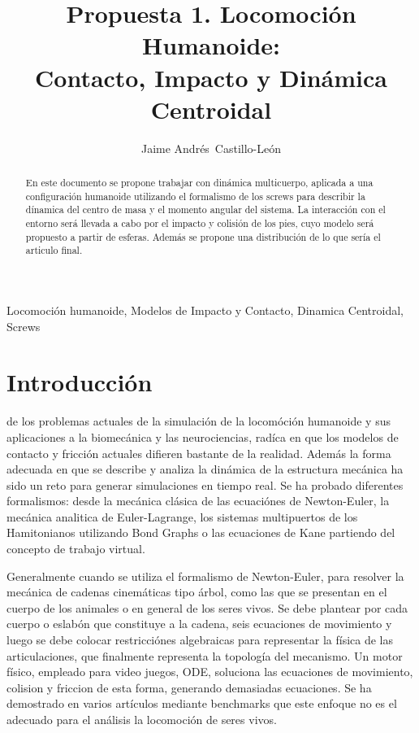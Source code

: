 \documentclass[journal,letterpaper,twoside,twocolumn]{IEEEtran}
\title{Propuesta 1. Locomoción Humanoide:\\Contacto, Impacto y Dinámica Centroidal}
\author{Jaime Andrés~Castillo-León}
\begin{document}
\maketitle
\begin{abstract}
  En este documento se propone trabajar con dinámica multicuerpo, aplicada a una configuración humanoide utilizando el formalismo de los screws para describir la dínamica del centro de masa y el momento angular del sistema. La interacción con el entorno será llevada a cabo por el impacto y colisión de los pies, cuyo modelo será propuesto a partir de esferas. Además se propone una distribución de lo que sería el articulo final.
\end{abstract}
\begin{IEEEkeywords}
  Locomoción humanoide, Modelos de Impacto y Contacto, Dinamica Centroidal, Screws
\end{IEEEkeywords}

\section{Introducción}
\label{sec:intro}
 de los problemas actuales de la simulación de la locomóción humanoide y sus aplicaciones a la biomecánica y las neurociencias, radíca en que los modelos de contacto y fricción actuales difieren bastante de la realidad. Además la forma adecuada en que se describe y analiza la dinámica de la estructura mecánica ha sido un reto para generar simulaciones en tiempo real. Se ha probado diferentes formalismos: desde la mecánica clásica de las ecuaciónes de Newton-Euler, la mecánica analitica de Euler-Lagrange, los sistemas multipuertos de los Hamitonianos utilizando Bond Graphs o las ecuaciones de Kane partiendo del concepto de trabajo virtual. 

Generalmente cuando se utiliza el formalismo de Newton-Euler, para resolver la mecánica de cadenas cinemáticas tipo árbol, como las que se presentan en el cuerpo de los animales o en general de los seres vivos. Se debe plantear por cada cuerpo o eslabón que constituye a la cadena, seis ecuaciones de movimiento y luego se debe colocar restricciónes algebraicas para representar la física de las articulaciones, que finalmente representa la topología del mecanismo. Un motor físico, empleado para video juegos, ODE, soluciona las ecuaciones de movimiento, colision y friccion de esta forma, generando demasiadas ecuaciones. Se ha demostrado en varios artículos mediante benchmarks que este enfoque no es el adecuado para el análisis la locomoción de seres vivos.
\end{document}
